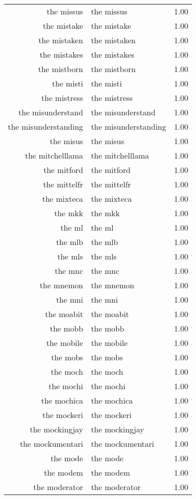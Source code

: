 \begin{table}[ht]
\begin{tabular}{rlr}
  the missus & the missus & 1.00 \\ 
  the mistake & the mistake & 1.00 \\ 
  the mistaken & the mistaken & 1.00 \\ 
  the mistakes & the mistakes & 1.00 \\ 
  the mistborn & the mistborn & 1.00 \\ 
  the misti & the misti & 1.00 \\ 
  the mistress & the mistress & 1.00 \\ 
  the misunderstand & the misunderstand & 1.00 \\ 
  the misunderstanding & the misunderstanding & 1.00 \\ 
  the misus & the misus & 1.00 \\ 
  the mitchelllama & the mitchelllama & 1.00 \\ 
  the mitford & the mitford & 1.00 \\ 
  the mittelfr & the mittelfr & 1.00 \\ 
  the mixteca & the mixteca & 1.00 \\ 
  the mkk & the mkk & 1.00 \\ 
  the ml & the ml & 1.00 \\ 
  the mlb & the mlb & 1.00 \\ 
  the mls & the mls & 1.00 \\ 
  the mnc & the mnc & 1.00 \\ 
  the mnemon & the mnemon & 1.00 \\ 
  the mni & the mni & 1.00 \\ 
  the moabit & the moabit & 1.00 \\ 
  the mobb & the mobb & 1.00 \\ 
  the mobile & the mobile & 1.00 \\ 
  the mobs & the mobs & 1.00 \\ 
  the moch & the moch & 1.00 \\ 
  the mochi & the mochi & 1.00 \\ 
  the mochica & the mochica & 1.00 \\ 
  the mockeri & the mockeri & 1.00 \\ 
  the mockingjay & the mockingjay & 1.00 \\ 
  the mockumentari & the mockumentari & 1.00 \\ 
  the mode & the mode & 1.00 \\ 
  the modem & the modem & 1.00 \\ 
  the moderator & the moderator & 1.00 \\ 

\end{tabular}
\end{table}
